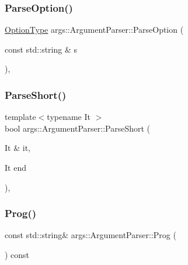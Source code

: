 \subsubsection{\texorpdfstring{Parse\+Option()}{ParseOption()}}
{\footnotesize\ttfamily \hyperlink{classargs_1_1_argument_parser_af01ec624f521beee7a1ac7ff589a3788}{Option\+Type} args\+::\+Argument\+Parser\+::\+Parse\+Option (\begin{DoxyParamCaption}\item[{const std\+::string \&}]{s }\end{DoxyParamCaption})\hspace{0.3cm}{\ttfamily [inline]}, {\ttfamily [protected]}}

\mbox{\label{classargs_1_1_argument_parser_a7c975868c3cdcd14465dad5cbaab07b1}} 
\subsubsection{\texorpdfstring{Parse\+Short()}{ParseShort()}}
{\footnotesize\ttfamily template$<$typename It $>$ \\
bool args\+::\+Argument\+Parser\+::\+Parse\+Short (\begin{DoxyParamCaption}\item[{It \&}]{it,  }\item[{It}]{end }\end{DoxyParamCaption})\hspace{0.3cm}{\ttfamily [inline]}, {\ttfamily [protected]}}

\mbox{\label{classargs_1_1_argument_parser_ac085920cbb59e059fd57233990525707}} 
\subsubsection{\texorpdfstring{Prog()}{Prog()}\hspace{0.1cm}{\footnotesize\ttfamily [1/2]}}
{\footnotesize\ttfamily const std\+::string\& args\+::\+Argument\+Parser\+::\+Prog (\begin{DoxyParamCaption}{ }\end{DoxyParamCaption}) const\hspace{0.3cm}{\ttfamily [inline]}}


